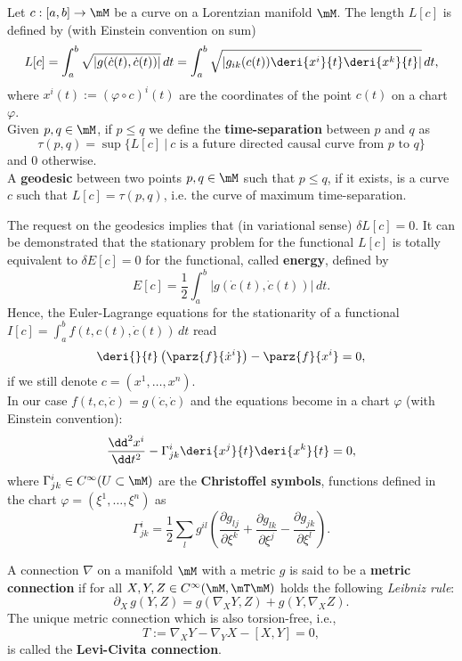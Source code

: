 \begin{definition}
	Let $c : [a,b]\to \mM$ be a curve on a Lorentzian manifold $\mM$. The
	length $L[c]$ is defined by (with Einstein convention on sum)
	\[ L[c]=\int_{a}^{b} \sqrt{|g(\dot{c}(t),\dot{c}(t))|}\,d t=\int_{a}^{b} \sqrt{\left|g_{ik}(c(t)) \deri{x^i}{t}\deri{x^k}{t}\right|}\,d t,\]
	where $x^i(t):=(\varphi\circ c)^i(t)$ are the coordinates of the point $c(t)$ on a chart $\varphi$.\\
	Given $p,q\in\mM$, if $p\leq q$ we define the \textbf{time-separation} between $p$ and $q$ as
	\[\tau(p,q)=\sup\{L[c]\ |\ c \text{ is a future directed causal curve from }p\text{ to } q\} \]
	and $0$ otherwise.\\
	A \textbf{geodesic} between two points $p,q\in\mM$ such that $p\leq q$, if it exists, is a curve $c$ such that $L[c]=\tau(p,q)$, i.e. the curve of maximum time-separation.
\end{definition}
The request on the geodesics implies that (in variational sense) $\delta L[c]=0$. It can be demonstrated that the stationary problem for the functional $L[c]$ is totally equivalent to $\delta E[c]=0$ for the functional, called \textbf{energy}, defined by
\[		E[c]=\frac{1}{2}\int_{a}^{b} {|g(\dot{c}(t),\dot{c}(t))|}\,d t.	\]
Hence, the Euler-Lagrange equations for the stationarity of a functional $I[c]=\int_{a}^{b} f(t,c(t),\dot{c}(t))\, dt$ read
\[		\deri{ }{t}\left(\parz{f}{\dot{x}^i}\right)-\parz{f}{x^i}=0,	\]
if we still denote $c=(x^1,\dots,x^n)$.\\
In our case $f(t,c,\dot{c})=g(\dot{c},\dot{c})$ and the equations become in a chart $\varphi$ (with Einstein convention):
\[  \frac{\dd^2 x^i}{\dd t^2}-\Gamma_{jk}^i\deri{x^j}{t}\deri{x^k}{t}=0,	\]
where $\Gamma_{jk}^i\in C^\infty (U\subset\mM)$ are the \textbf{Christoffel symbols}, functions defined in the chart $\varphi=(\xi^1,\dots,\xi^n)$ as
\[	\Gamma_{jk}^i=\frac12 \sum_l g^{il} \left(
\frac{\partial g_{lj}}{\partial \xi^k} 
+\frac{\partial g_{lk}}{\partial \xi^j}
-\frac{\partial g_{jk}}{\partial \xi^l}
\right).	\]

\begin{definition}
	A connection $\nabla$ on a manifold $\mM$ with a metric $g$ is said to be a \textbf{metric connection} if for all $X,Y,Z\in C^\infty (\mM,\mT\mM)$ holds the following \emph{Leibniz rule}:
	\[		\partial_X\,g(Y,Z)=g(\nabla_X Y, Z)+g(Y,\nabla_X Z).	\]
	The unique metric connection which is also torsion-free, i.e.,
	\[		T:=\nabla_X Y-\nabla_Y X-[X,Y]=0,	\]
	is called the \textbf{Levi-Civita connection}. 
\end{definition}

